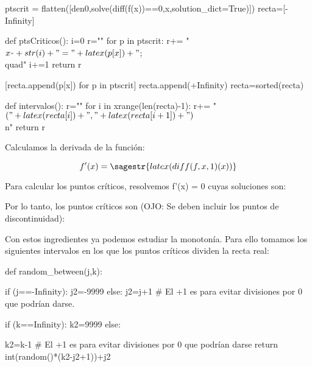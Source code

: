 \documentclass[nochap,palatino]{apuntes}
\begin{document}
\begin{problem}
\begin{sagesilent}
ptscrit = flatten([den0,solve(diff(f(x))==0,x,solution_dict=True)])
recta=[-Infinity]

def ptsCriticos():
    i=0
    r=""
    for p in ptscrit:
        r+= "$x_"+str(i)+"="+latex(p[x])+"$;\\quad"
        i+=1
    return r

[recta.append(p[x]) for p in ptscrit]
recta.append(+Infinity)
recta=sorted(recta)

def intervalos():
    r=""
    for i in xrange(len(recta)-1):
	    r+= "$("+latex(recta[i])+","+latex(recta[i+1])+")$\\n"  
	return r

\end{sagesilent}
Calculamos la derivada de la función:

\[f'(x) = \sagestr{latex(diff(f,x,1)(x))} \]

Para calcular los puntos críticos, resolvemos f'(x) = 0 cuyas soluciones son: 

Por lo tanto, los puntos críticos son (OJO: Se deben incluir los puntos de discontinuidad): 


Con estos ingredientes ya podemos estudiar la monotonía. Para ello tomamos los siguientes intervalos en los que los puntos críticos dividen la recta real:




   
\begin{sagesilent}



def random_between(j,k):
    
    if (j==-Infinity):
        j2=-9999
    else:
        j2=j+1 # El +1 es para evitar divisiones por 0 que podrían darse.
        
    if (k==Infinity):
        k2=9999
    else:        
        
        k2=k-1 # El +1 es para evitar divisiones por 0 que podrían darse
    return int(random()*(k2-j2+1))+j2
\end{sagesilent}

\end{problem}
\end{document}
